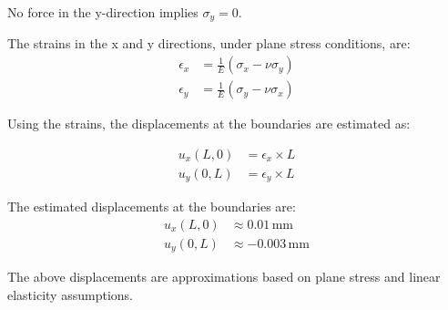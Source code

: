 \documentclass[twoside,twocolumn,10pt]{article}
\begin{document}
No force in the y-direction implies \( \sigma_y = 0 \).

The strains in the x and y directions, under plane stress conditions, are:
\begin{equation}
\begin{aligned}
\epsilon_x &= \frac{1}{E} (\sigma_x - \nu \sigma_y) \\
\epsilon_y &= \frac{1}{E} (\sigma_y - \nu \sigma_x)
\end{aligned}
\end{equation}

Using the strains, the displacements at the boundaries are estimated as:

\begin{equation}
\begin{aligned}
u_x(L, 0) &= \epsilon_x \times L \\
u_y(0, L) &= \epsilon_y \times L
\end{aligned}
\end{equation}

The estimated displacements at the boundaries are:
\begin{equation}
\begin{aligned}
u_x(L, 0) &\approx 0.01 \, \text{mm} \\
u_y(0, L) &\approx -0.003 \, \text{mm}
\end{aligned}
\end{equation}

The above displacements are approximations based on plane stress and linear elasticity assumptions.
\end{document}
